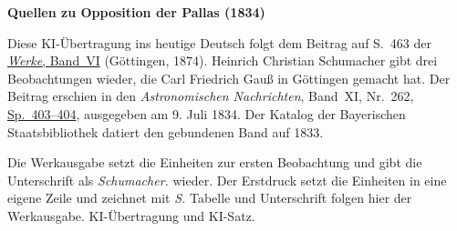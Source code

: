 \clearpage\thispagestyle{empty}
\begin{center}\textbf{Quellen zu Opposition der Pallas (1834)}\end{center}
\noindent Diese KI-Übertragung ins heutige Deutsch folgt dem Beitrag auf S.~463 der \href{https://gdz.sub.uni-goettingen.de/id/PPN236007467}{\textit{Werke}, Band~VI} (Göttingen, 1874). Heinrich Christian Schumacher gibt drei Beobachtungen wieder, die Carl Friedrich Gauß in Göttingen gemacht hat. Der Beitrag erschien in den \textit{Astronomischen Nachrichten}, Band~XI, Nr.~262, \href{https://api.digitale-sammlungen.de/iiif/image/v2/bsb10049436_00218/full/1800,/0/default.jpg}{Sp.~403--404}, ausgegeben am 9. Juli 1834. Der Katalog der Bayerischen Staatsbibliothek datiert den gebundenen Band auf 1833.
\par\smallskip\noindent Die Werkausgabe setzt die Einheiten zur ersten Beobachtung und gibt die Unterschrift als \textit{Schumacher.} wieder. Der Erstdruck setzt die Einheiten in eine eigene Zeile und zeichnet mit \textit{S.} Tabelle und Unterschrift folgen hier der Werkausgabe. KI-Übertragung und KI-Satz.
\clearpage
